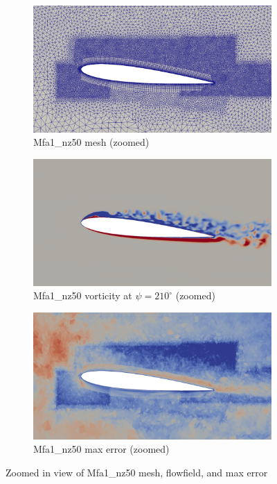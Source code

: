 \begin{figure}[H]
	\centering
	\begin{subfigure}[b]{0.7\textwidth}
		\centering
		\includegraphics[width=1\textwidth]{figures/adapt_strat/zoomed/Mfa1_mesh.png}
		\caption{Mfa1\_nz50 mesh (zoomed)}
		\label{fig:Mfa1_mesh_zoomed}
	\end{subfigure}
	\begin{subfigure}[b]{0.7\textwidth}
		\centering
		\includegraphics[width=1\textwidth]{figures/adapt_strat/zoomed/Mfa1_ph_210.png}
		\caption{Mfa1\_nz50 vorticity at $\psi=210^\circ$ (zoomed)}
		\label{fig:Mfa1_vorticity_zoomed}
	\end{subfigure}
	\begin{subfigure}[b]{0.7\textwidth}
		\centering
		\includegraphics[width=1\textwidth]{figures/adapt_strat/zoomed/Mfa1_error.png}
		\caption{Mfa1\_nz50 max error (zoomed)}
		\label{fig:Mfa1_max_error_zoomed}
	\end{subfigure}
	\caption{Zoomed in view of Mfa1\_nz50 mesh, flowfield, and max error}
	\label{fig:Mfa1_zoomed}
\end{figure}



